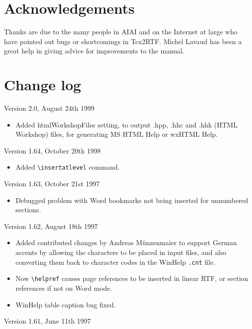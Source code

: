 \section{Acknowledgements}%

Thanks are due to the many people in AIAI and on the Internet at large
who have pointed out bugs or shortcomings in Tex2RTF. Michel Lavaud has been
a great help in giving advice for improvements to the manual.

\section{Change log}%

Version 2.0, August 24th 1999

\begin{itemize}\itemsep=0pt
\item Added htmlWorkshopFiles setting, to output .hpp, .hhc
and .hhk (HTML Workshop) files, for generating MS HTML Help or wxHTML Help.
\end{itemize}

Version 1.64, October 20th 1998

\begin{itemize}\itemsep=0pt
\item Added \verb$\insertatlevel$ command.
\end{itemize}

Version 1.63, October 21st 1997

\begin{itemize}\itemsep=0pt
\item Debugged problem with Word bookmarks not being inserted for unnumbered
sections.
\end{itemize}

Version 1.62, August 18th 1997

\begin{itemize}\itemsep=0pt
\item Added contributed changes by Andreas Münzenmaier to support German
accents by allowing the characters to be placed in input files, and also
converting them back to character codes in the WinHelp {\tt .cnt} file.
\item Now \verb$\helpref$ causes page references to be inserted in linear RTF,
or section references if not on Word mode.
\item WinHelp table caption bug fixed.
\end{itemize}

Version 1.61, June 11th 1997

